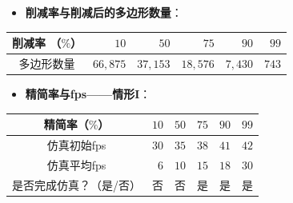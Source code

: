 \begin{frame}
\begin{itemize}
  \item \textbf{削减率与削减后的多边形数量}：
\end{itemize}
\begin{table}[h]
\renewcommand{\arraystretch}{0.5}
\centering
\begin{tabular*}{90mm}{c r r r r r}
\toprule
\hspace{2mm} \small{削减率 （$\%$）}  &     \small{$10$} &     \small{$50$} &     \small{$75$} &    \small{$90$} &  \small{$99$} \\
\midrule
\hspace{2mm} \small{多边形数量}     & \small{$66,875$} & \small{$37,153$} & \small{$18,576$} & \small{$7,430$} & \small{$743$} \\
\bottomrule
\end{tabular*}
\end{table}
\end{frame}

\begin{frame}
\begin{itemize}
  \item \textbf{精简率与fps——情形I}：
\end{itemize}
\begin{table}[t]
\renewcommand{\arraystretch}{0.5}
\centering
\begin{tabular*}{90mm}{c r r r r r}
\toprule
\hspace{5mm} \small{精简率（$\%$）}           & \small{$10$} & \small{$50$} & \small{$75$} & \small{$90$} & \small{$99$} \\
\midrule
\hspace{5mm} \small{仿真初始fps}              & \small{$30$} & \small{$35$} & \small{$38$} & \small{$41$} & \small{$42$} \\
\midrule
\hspace{5mm} \small{仿真平均fps}              &  \small{$6$} & \small{$10$} & \small{$15$} & \small{$18$} & \small{$30$} \\
\midrule
\hspace{5mm} \small{是否完成仿真？（是/否）}  &  \small{否}  &  \small{否}  & \small{是}   & \small{是}   & \small{是}   \\
\bottomrule
\end{tabular*}
\end{table}
\end{frame}

